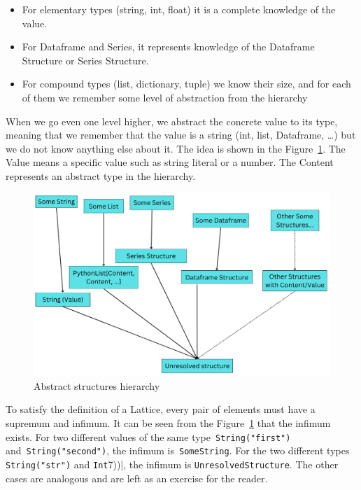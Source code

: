 \begin{itemize}
    \item For elementary types (string, int, float) it is a complete knowledge of the value.
    \item For Dataframe and Series, it represents knowledge of the Dataframe Structure or Series Structure.
    \item For compound types (list, dictionary, tuple) we know their size, and for each of them we remember some level
    of abstraction from the hierarchy
\end{itemize}

When we go even one level higher, we abstract the concrete value to its type, meaning that we remember that the value
is a string (int, list, Dataframe, \ldots) but we do not know anything else about it.
The idea is shown in the Figure~\ref{fig:abstract_hierarchy}.
The Value means a specific value such as string literal or a number.
The Content represents an abstract type in the hierarchy.

\begin{figure}[H]
    \caption{Abstract structures hierarchy}
    \label{fig:abstract_hierarchy}
    \centering
    \includegraphics[scale=0.5]{img/Hierarchy}
\end{figure}

To satisfy the definition of a Lattice, every pair of elements must have a supremum and infimum.
It can be seen from the Figure~\ref{fig:abstract_hierarchy} that the infimum exists.
For two different values of the same type~\verb|String("first")| and~\verb|String("second")|, the infimum
is~\verb|SomeString|.
For the two different types \verb|String("str")| and \verb(Int(7))|, the infimum is \verb|UnresolvedStructure|.
The other cases are analogous and are left as an exercise for the reader.

